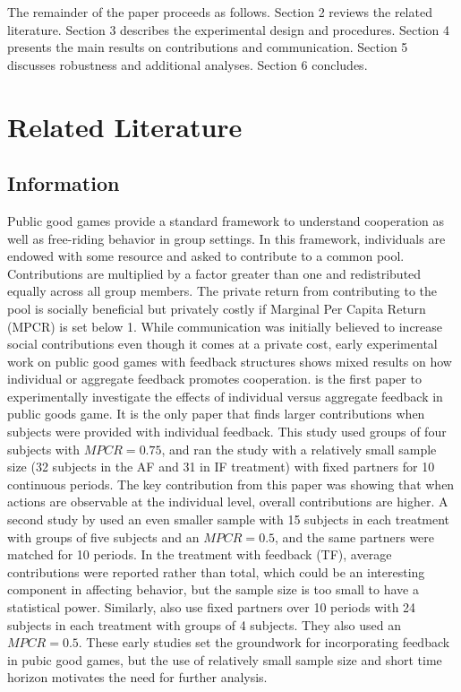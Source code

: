 \documentclass[12pt,letterpaper,english]{article}
\begin{document}
The remainder of the paper proceeds as follows. Section 2 reviews the related literature. Section 3 describes the experimental design and procedures. Section 4 presents the main results on contributions and communication. Section 5 discusses robustness and additional analyses. Section 6 concludes.

\section{Related Literature}

\subsection{Information}


Public good games provide a standard framework to understand cooperation as well as free-riding behavior in group settings. 
In this framework, individuals are endowed with some resource and asked to contribute to a common pool. Contributions are multiplied by a factor greater than one and redistributed equally across all group members. The private return from contributing to the pool is socially beneficial but privately costly if Marginal Per Capita Return (MPCR) is set below 1. While communication was initially believed to increase social contributions even though it comes at a private cost, early experimental work on public good games with feedback structures shows mixed results on how individual or aggregate feedback promotes cooperation.
\cite{sell1991levels} is the first paper to experimentally investigate the effects of individual versus aggregate feedback in public goods game. It is the only paper that finds larger contributions when subjects were provided with individual feedback. This study used groups of four subjects with $MPCR = 0.75$, and ran the study with a relatively small sample size (32 subjects in the AF and 31 in IF treatment) with fixed partners for 10 continuous periods. The key contribution from this paper was showing that when actions are observable at the individual level, overall contributions are higher. A second study by \cite{weimann1994individual} used an even smaller sample with 15 subjects in each treatment with groups of five subjects and an $MPCR = 0.5$, and the same partners were matched for 10 periods. In the treatment with feedback (TF), average contributions were reported rather than total, which could be an interesting component in affecting behavior, but the sample size is too small to have a statistical power. Similarly, \cite{croson2001feedback} also use fixed partners over 10 periods with 24 subjects in each treatment with groups of 4 subjects. They also used an $MPCR = 0.5$. These early studies set the groundwork for incorporating feedback in pubic good games, but the use of relatively small sample size and short time horizon motivates the need for further analysis.
\end{document}
